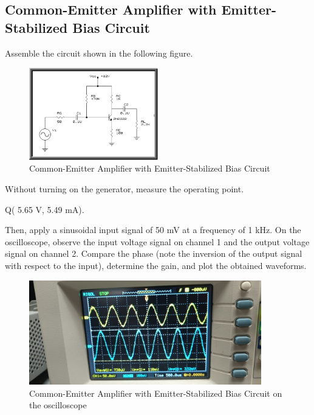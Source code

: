 \subsection{Common-Emitter Amplifier with Emitter-Stabilized Bias Circuit}

Assemble the circuit shown in the following figure.
\begin{figure}[H]
    \centering
    \includegraphics[width = 0.5\textwidth]{Imagenes/Imagenes_Juan/Common-Emitter Amplifier with Emitter-Stabilized Bias Circuit.PNG}
    \caption{Common-Emitter Amplifier with Emitter-Stabilized Bias Circuit}
    \label{circuit2}
\end{figure}

Without turning on the generator, measure the operating point.

\begin{center}
    Q( 5.65 V, 5.49 mA).
\end{center}

Then, apply a sinusoidal input signal of 50 mV at a frequency of 1 kHz.
On the oscilloscope, observe the input voltage signal on channel 1 and the output voltage signal on channel 
2. Compare the phase (note the inversion of the output signal with respect to the input), determine the 
gain, and plot the obtained waveforms.

\begin{figure}[H]
    \centering
    \includegraphics[width = 0.9\textwidth]{Imagenes/Imagenes_Juan/Osciloscopio Circuito 2.jpg}
    \caption{Common-Emitter Amplifier with Emitter-Stabilized Bias Circuit on the oscilloscope}
    \label{circuit2Osciloscopio}
\end{figure}

